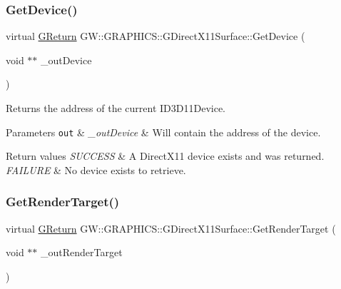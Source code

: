 \subsubsection{\texorpdfstring{Get\+Device()}{GetDevice()}}
{\footnotesize\ttfamily virtual \mbox{\hyperlink{namespace_g_w_a67a839e3df7ea8a5c5686613a7a3de21}{G\+Return}} G\+W\+::\+G\+R\+A\+P\+H\+I\+C\+S\+::\+G\+Direct\+X11\+Surface\+::\+Get\+Device (\begin{DoxyParamCaption}\item[{void $\ast$$\ast$}]{\+\_\+out\+Device }\end{DoxyParamCaption})\hspace{0.3cm}{\ttfamily [pure virtual]}}



Returns the address of the current I\+D3\+D11\+Device. 


\begin{DoxyParams}[1]{Parameters}
\mbox{\tt out}  & {\em \+\_\+out\+Device} & Will contain the address of the device.\\
\hline
\end{DoxyParams}

\begin{DoxyRetVals}{Return values}
{\em S\+U\+C\+C\+E\+SS} & A Direct\+X11 device exists and was returned. \\
\hline
{\em F\+A\+I\+L\+U\+RE} & No device exists to retrieve. \\
\hline
\end{DoxyRetVals}
\mbox{\label{class_g_w_1_1_g_r_a_p_h_i_c_s_1_1_g_direct_x11_surface_a953f4809860408b0e99928ac8b9b6a53}} 
\subsubsection{\texorpdfstring{Get\+Render\+Target()}{GetRenderTarget()}}
{\footnotesize\ttfamily virtual \mbox{\hyperlink{namespace_g_w_a67a839e3df7ea8a5c5686613a7a3de21}{G\+Return}} G\+W\+::\+G\+R\+A\+P\+H\+I\+C\+S\+::\+G\+Direct\+X11\+Surface\+::\+Get\+Render\+Target (\begin{DoxyParamCaption}\item[{void $\ast$$\ast$}]{\+\_\+out\+Render\+Target }\end{DoxyParamCaption})\hspace{0.3cm}{\ttfamily [pure virtual]}}



